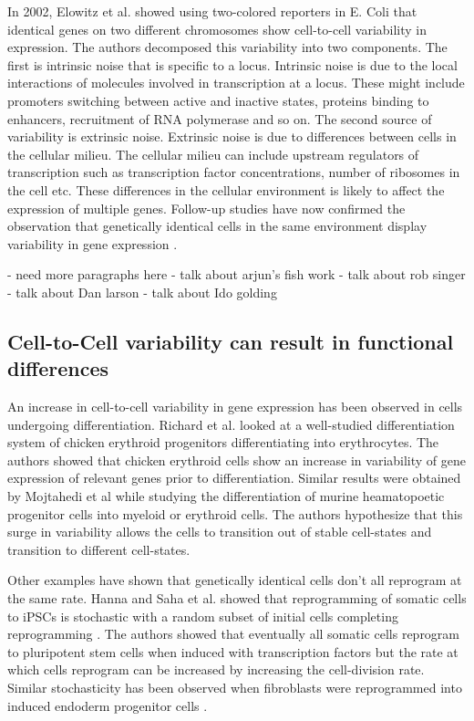 In 2002, Elowitz et al.  \cite{elowitz_stochastic_2002} showed using two-colored reporters in E. Coli that identical genes on two different chromosomes show cell-to-cell variability in expression. The authors decomposed this variability into two components. The first is intrinsic noise that is specific to a locus. Intrinsic noise is due to the local interactions of molecules involved in transcription at a locus. These might include promoters switching between active and inactive states, proteins binding to enhancers, recruitment of RNA polymerase and so on. The second source of variability is extrinsic noise. Extrinsic noise is due to differences between cells in the cellular milieu. The cellular milieu can include upstream regulators of transcription such as transcription factor concentrations, number of ribosomes in the cell etc. These differences in the cellular environment is likely to affect the expression of multiple genes. Follow-up studies have now confirmed the observation that genetically identical cells in the same environment display variability in gene expression \cite{raser_control_2004,blake_phenotypic_2006,blake_noise_2003,raser_noise_2005,volfson_origins_2006}.

- need more paragraphs here
- talk about arjun's fish work
- talk about rob singer
- talk about Dan larson
- talk about Ido golding


\subsection{Cell-to-Cell variability can result in functional differences}
An increase in cell-to-cell variability in gene expression has been observed in cells undergoing differentiation. Richard et al.  \cite{richard_single-cell-based_2016} looked at a well-studied differentiation system of chicken erythroid progenitors differentiating into erythrocytes. The authors showed that chicken erythroid cells show an increase in variability of gene expression of relevant genes prior to differentiation. Similar results were obtained by Mojtahedi et al  \cite{mojtahedi_cell_2016} while studying the differentiation of murine heamatopoetic progenitor cells into myeloid or erythroid cells. The authors hypothesize that this surge in variability allows the cells to transition out of stable cell-states and transition to different cell-states. 


Other examples have shown that genetically identical cells don't all reprogram at the same rate. Hanna and Saha et al. showed that reprogramming of somatic cells to iPSCs is stochastic with a random subset of initial cells completing reprogramming  \cite{hanna_direct_2009}. The authors showed that eventually all somatic cells reprogram to pluripotent stem cells when induced with transcription factors but the rate at which cells reprogram can be increased by increasing the cell-division rate. Similar stochasticity has been observed when fibroblasts were reprogrammed into induced endoderm progenitor cells \cite{biddy_single-cell_2018}.

